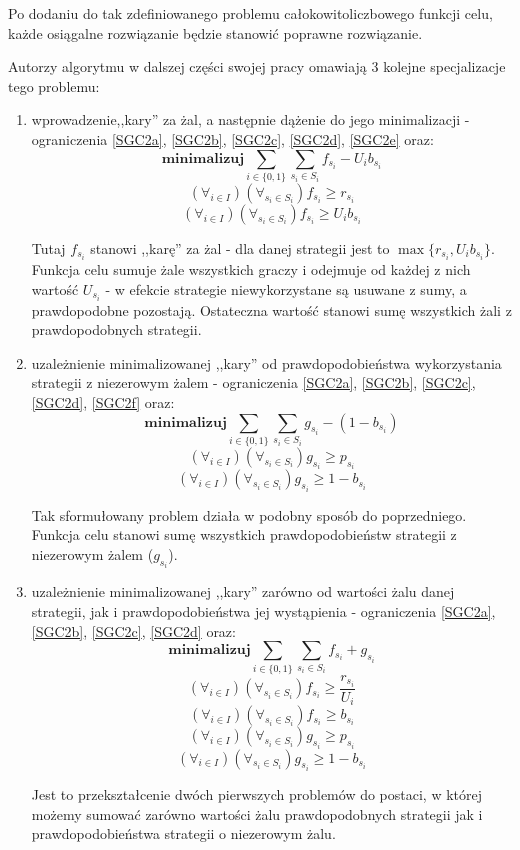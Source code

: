 \documentclass[polish]{standalone}
\begin{document}
Po dodaniu do tak zdefiniowanego problemu całokowitoliczbowego funkcji celu, każde osiągalne rozwiązanie będzie stanowić
poprawne rozwiązanie. \cite[str.~2]{SCG-NE}

Autorzy algorytmu w dalszej części swojej pracy omawiają 3 kolejne specjalizacje tego problemu:
\begin{enumerate}
\item wprowadzenie,,kary'' za żal, a następnie dążenie do jego minimalizacji - ograniczenia \ref{SGC2a}, \ref{SGC2b},
\ref{SGC2c}, \ref{SGC2d}, \ref{SGC2e} oraz:
$$\textbf{minimalizuj} \sum_{i \in \{0,1\}} \sum_{s_i \in S_i} f_{s_i} - U_i b_{s_i}$$
$$(\forall_{i \in I}) (\forall_{s_i \in S_i}) f_{s_i} \geq r_{s_i}$$
$$(\forall_{i \in I}) (\forall_{s_i \in S_i}) f_{s_i} \geq U_i b_{s_i}$$
\cite[str.~2]{SCG-NE}

Tutaj $f_{s_i}$ stanowi ,,karę'' za żal - dla danej strategii jest to $\max \{ r_{s_i}, U_i b_{s_i} \}$. Funkcja celu
sumuje żale wszystkich graczy i odejmuje od każdej z nich wartość $U_{s_i}$ - w efekcie strategie niewykorzystane są
usuwane z sumy, a prawdopodobne pozostają. Ostateczna wartość stanowi sumę wszystkich żali z prawdopodobnych strategii.

\item uzależnienie minimalizowanej ,,kary'' od prawdopodobieństwa wykorzystania strategii z niezerowym żalem
- ograniczenia \ref{SGC2a}, \ref{SGC2b}, \ref{SGC2c}, \ref{SGC2d}, \ref{SGC2f} oraz:
$$\textbf{minimalizuj} \sum_{i \in \{0,1\}} \sum_{s_i \in S_i} g_{s_i} - (1 - b_{s_i})$$
$$(\forall_{i \in I}) (\forall_{s_i \in S_i}) g_{s_i} \geq p_{s_i}$$
$$(\forall_{i \in I}) (\forall_{s_i \in S_i}) g_{s_i} \geq 1 - b_{s_i}$$
\cite[str.~2]{SCG-NE}

Tak sformułowany problem działa w podobny sposób do poprzedniego. Funkcja celu stanowi sumę wszystkich
prawdopodobieństw strategii z niezerowym żalem ($g_{s_i}$).

\item uzależnienie minimalizowanej ,,kary'' zarówno od wartości żalu danej strategii, jak i prawdopodobieństwa jej
wystąpienia - ograniczenia \ref{SGC2a}, \ref{SGC2b}, \ref{SGC2c}, \ref{SGC2d} oraz:
$$\textbf{minimalizuj} \sum_{i \in \{0,1\}} \sum_{s_i \in S_i} f_{s_i} + g_{s_i}$$
$$(\forall_{i \in I}) (\forall_{s_i \in S_i}) f_{s_i} \geq \frac{r_{s_i}}{U_i}$$
$$(\forall_{i \in I}) (\forall_{s_i \in S_i}) f_{s_i} \geq b_{s_i}$$
$$(\forall_{i \in I}) (\forall_{s_i \in S_i}) g_{s_i} \geq p_{s_i}$$
$$(\forall_{i \in I}) (\forall_{s_i \in S_i}) g_{s_i} \geq 1 - b_{s_i}$$
\cite[str.~2--3]{SCG-NE}

Jest to przekształcenie dwóch pierwszych problemów do postaci, w której możemy sumować zarówno wartości żalu
prawdopodobnych strategii jak i prawdopodobieństwa strategii o niezerowym żalu.
\end{enumerate}
\end{document}
